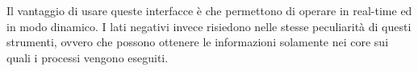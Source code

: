 Il vantaggio di usare queste interfacce è che permettono di operare in real-time ed in modo dinamico. I lati negativi invece risiedono nelle stesse peculiarità di questi strumenti, ovvero che possono ottenere le informazioni solamente nei core sui quali i processi vengono eseguiti. 



